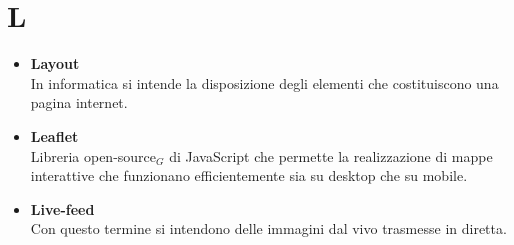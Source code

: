 \chapter{L} \label{L}
\begin{itemize}
	\item \textbf{Layout}\\
	In informatica si intende la disposizione degli elementi che costituiscono una pagina internet.
	
	\item \textbf{Leaflet} \\
	Libreria open-source$_G$ di JavaScript che permette la realizzazione di mappe interattive che funzionano efficientemente sia su desktop che su mobile.

	\item \textbf{Live-feed}\\
	Con questo termine si intendono delle immagini dal vivo trasmesse in diretta.

\end{itemize}
